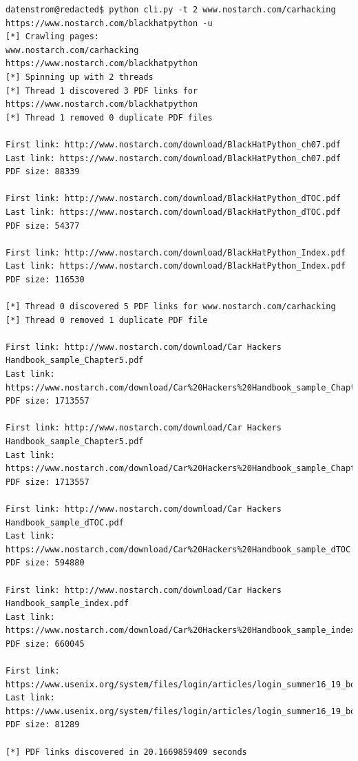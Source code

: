 \documentclass[12pt, a4paper]{article}
\begin{document}
\vspace{2em}
\begin{verbatim}
datenstrom@redacted$ python cli.py -t 2 www.nostarch.com/carhacking https://www.nostarch.com/blackhatpython -u
[*] Crawling pages:
www.nostarch.com/carhacking
https://www.nostarch.com/blackhatpython
[*] Spinning up with 2 threads
[*] Thread 1 discovered 3 PDF links for https://www.nostarch.com/blackhatpython
[*] Thread 1 removed 0 duplicate PDF files

First link: http://www.nostarch.com/download/BlackHatPython_ch07.pdf
Last link: https://www.nostarch.com/download/BlackHatPython_ch07.pdf
PDF size: 88339

First link: http://www.nostarch.com/download/BlackHatPython_dTOC.pdf
Last link: https://www.nostarch.com/download/BlackHatPython_dTOC.pdf
PDF size: 54377

First link: http://www.nostarch.com/download/BlackHatPython_Index.pdf
Last link: https://www.nostarch.com/download/BlackHatPython_Index.pdf
PDF size: 116530

[*] Thread 0 discovered 5 PDF links for www.nostarch.com/carhacking
[*] Thread 0 removed 1 duplicate PDF file

First link: http://www.nostarch.com/download/Car Hackers Handbook_sample_Chapter5.pdf
Last link: https://www.nostarch.com/download/Car%20Hackers%20Handbook_sample_Chapter5.pdf
PDF size: 1713557

First link: http://www.nostarch.com/download/Car Hackers Handbook_sample_Chapter5.pdf
Last link: https://www.nostarch.com/download/Car%20Hackers%20Handbook_sample_Chapter5.pdf
PDF size: 1713557

First link: http://www.nostarch.com/download/Car Hackers Handbook_sample_dTOC.pdf
Last link: https://www.nostarch.com/download/Car%20Hackers%20Handbook_sample_dTOC.pdf
PDF size: 594880

First link: http://www.nostarch.com/download/Car Hackers Handbook_sample_index.pdf
Last link: https://www.nostarch.com/download/Car%20Hackers%20Handbook_sample_index.pdf
PDF size: 660045

First link: https://www.usenix.org/system/files/login/articles/login_summer16_19_books.pdf
Last link: https://www.usenix.org/system/files/login/articles/login_summer16_19_books.pdf
PDF size: 81289

[*] PDF links discovered in 20.1669859409 seconds
\end{verbatim}
\vspace{1em}
\end{document}
